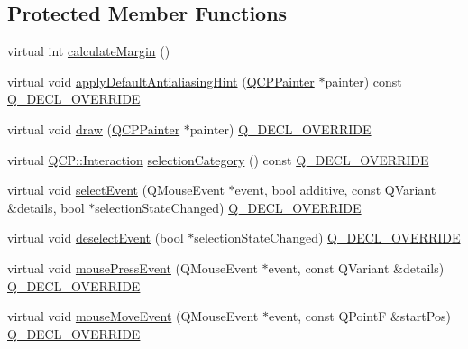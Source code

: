 \subsection*{Protected Member Functions}
\begin{DoxyCompactItemize}
\item 
virtual int \mbox{\hyperlink{class_q_c_p_axis_a47bdb0a55de6759489ee47665199aebb}{calculate\+Margin}} ()
\item 
virtual void \mbox{\hyperlink{class_q_c_p_axis_adbaeffcdc2707f2bd5dc1bbd11236770}{apply\+Default\+Antialiasing\+Hint}} (\mbox{\hyperlink{class_q_c_p_painter}{Q\+C\+P\+Painter}} $\ast$painter) const \mbox{\hyperlink{qcustomplot_8h_a42cc5eaeb25b85f8b52d2a4b94c56f55}{Q\+\_\+\+D\+E\+C\+L\+\_\+\+O\+V\+E\+R\+R\+I\+DE}}
\item 
virtual void \mbox{\hyperlink{class_q_c_p_axis_ac15ebb4225ca5212d8e5fffae481bc9b}{draw}} (\mbox{\hyperlink{class_q_c_p_painter}{Q\+C\+P\+Painter}} $\ast$painter) \mbox{\hyperlink{qcustomplot_8h_a42cc5eaeb25b85f8b52d2a4b94c56f55}{Q\+\_\+\+D\+E\+C\+L\+\_\+\+O\+V\+E\+R\+R\+I\+DE}}
\item 
virtual \mbox{\hyperlink{namespace_q_c_p_a2ad6bb6281c7c2d593d4277b44c2b037}{Q\+C\+P\+::\+Interaction}} \mbox{\hyperlink{class_q_c_p_axis_ab751e3e96495716a2f6742ca7d7b3d49}{selection\+Category}} () const \mbox{\hyperlink{qcustomplot_8h_a42cc5eaeb25b85f8b52d2a4b94c56f55}{Q\+\_\+\+D\+E\+C\+L\+\_\+\+O\+V\+E\+R\+R\+I\+DE}}
\item 
virtual void \mbox{\hyperlink{class_q_c_p_axis_a50c3ed18e189d48421ec2978f88e4f87}{select\+Event}} (Q\+Mouse\+Event $\ast$event, bool additive, const Q\+Variant \&details, bool $\ast$selection\+State\+Changed) \mbox{\hyperlink{qcustomplot_8h_a42cc5eaeb25b85f8b52d2a4b94c56f55}{Q\+\_\+\+D\+E\+C\+L\+\_\+\+O\+V\+E\+R\+R\+I\+DE}}
\item 
virtual void \mbox{\hyperlink{class_q_c_p_axis_a5bc1f8a8d0fbc7658eba70c80279ed31}{deselect\+Event}} (bool $\ast$selection\+State\+Changed) \mbox{\hyperlink{qcustomplot_8h_a42cc5eaeb25b85f8b52d2a4b94c56f55}{Q\+\_\+\+D\+E\+C\+L\+\_\+\+O\+V\+E\+R\+R\+I\+DE}}
\item 
virtual void \mbox{\hyperlink{class_q_c_p_axis_a61bc07cda6193a3fa6b5aa198fc4e4fa}{mouse\+Press\+Event}} (Q\+Mouse\+Event $\ast$event, const Q\+Variant \&details) \mbox{\hyperlink{qcustomplot_8h_a42cc5eaeb25b85f8b52d2a4b94c56f55}{Q\+\_\+\+D\+E\+C\+L\+\_\+\+O\+V\+E\+R\+R\+I\+DE}}
\item 
virtual void \mbox{\hyperlink{class_q_c_p_axis_ac5a269609e6177737faabdc46434d8c7}{mouse\+Move\+Event}} (Q\+Mouse\+Event $\ast$event, const Q\+PointF \&start\+Pos) \mbox{\hyperlink{qcustomplot_8h_a42cc5eaeb25b85f8b52d2a4b94c56f55}{Q\+\_\+\+D\+E\+C\+L\+\_\+\+O\+V\+E\+R\+R\+I\+DE}}

\end{DoxyCompactItemize}
